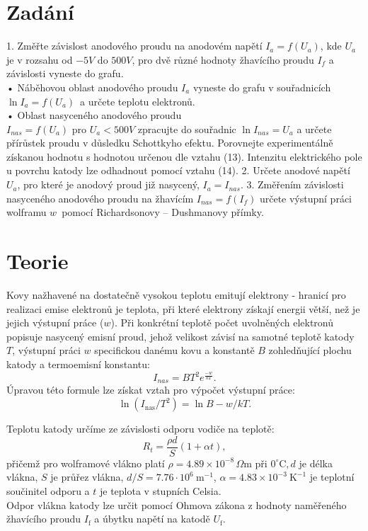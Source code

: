 \documentclass[czech,11pt,a4paper]{article}
\begin{document}
	\begin{multicols}{2}
		\section{Zadání}
		1. Změřte závislost anodového proudu na anodovém napětí $I_a = f(U_a)$, kde $U_a$ je v rozsahu
		od $-5V$ do $500V$, pro dvě různé hodnoty žhavícího proudu $I_f$ a závislosti vyneste do grafu.
			\\• Náběhovou oblast anodového proudu $I_a$ vyneste do grafu v souřadnicích $\ln I_a = f(U_a)$~a určete teplotu elektronů.
			\\• Oblast nasyceného anodového proudu \\$I_{nas} = f(U_a)$ pro $U_a < 500 V$ zpracujte do souřadnic $\ln I_{nas} =
		U_a$ a určete přírůstek proudu v důsledku Schottkyho efektu. Porovnejte experimentálně získanou hodnotu s hodnotou určenou dle vztahu (13). Intenzitu
		elektrického pole u povrchu katody lze odhadnout pomocí vztahu (14).
		2. Určete anodové napětí $U_a$, pro které je anodový proud již nasycený, $I_a = I_{nas}$.
		3. Změřením závislosti nasyceného anodového proudu na žhavícím $I_{nas} = f(I_f)$ určete výstupní
		práci wolframu $w$~pomocí Richardsonovy – Dushmanovy přímky.

		\section{Teorie}
		Kovy nažhavené na dostatečně vysokou teplotu emitují elektrony - hranicí pro realizaci emise elektronů je teplota, při které elektrony získají energii větší, než je jejich výstupní práce ($w$). Při konkrétní teplotě počet uvolněných elektronů popisuje nasycený emisní proud, jehož velikost závisí na samotné teplotě katody $T$, výstupní práci $w$ specifickou danému kovu a konstantě $B$ zohledňující plochu katody a termoemisní konstantu:
		\begin{equation}
			I_{nas} = BT^2 e^{\frac{-w}{kT}}.
		\end{equation}
		Úpravou této formule lze získat vztah pro výpočet výstupní práce:
		\begin{equation}			\ln \left(I_{\mathrm{nas}} / T^{2}\right)=\ln B-w / k T .		\end{equation}
		
		Teplotu katody určíme ze závislosti odporu vodiče na teplotě:
		\begin{equation}			
			R_{t}=\frac{\rho d}{S}(1+\alpha t),	\end{equation}
		přičemž pro wolframové vlákno platí  $\rho=4.89 \times 10^{-8}\, \Omega\mathrm{m}$ při $0^{\circ} \mathrm{C}, d$ je délka vlákna, $S$ je průřez vlákna, $d / S=7.76 \cdot 10^{6} \mathrm{~m}^{-1}$, $\alpha=4.83 \times 10^{-3} \mathrm{~K}^{-1}$ je teplotní součinitel odporu a $t$ je teplota v stupních Celsia. \\Odpor vlákna katody lze určit pomocí Ohmova zákona z hodnoty naměřeného žhavícího proudu $I_{\mathrm{f}}$ a úbytku napětí na katodě $U_{\mathrm{f}}$.
		

\end{multicols}
\end{document}
